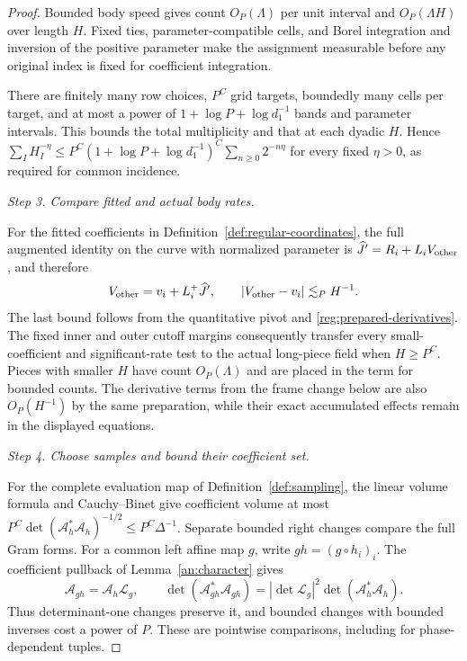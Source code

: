 \documentclass[11pt]{amsart}
\theoremstyle{definition}
\theoremstyle{remark}
\numberwithin{equation}{section}
\begin{document}
\begin{proof}
Bounded body speed gives count $O_P(\Lambda)$ per unit interval and $O_P(\Lambda H)$ over length $H$. Fixed ties, parameter-compatible cells, and Borel integration and inversion of the positive parameter make the assignment measurable before any original index is fixed for coefficient integration.

There are finitely many row choices, $P^C$ grid targets, boundedly many cells per target, and at most a power of $1+\log P+\log d_1^{-1}$ bands and parameter intervals. This bounds the total multiplicity and that at each dyadic $H$. Hence $\sum_I H_I^{-\eta}\le P^C(1+\log P+\log d_1^{-1})^C\sum_{n\ge0}2^{-n\eta}$ for every fixed $\eta>0$, as required for common incidence.

\par\medskip\noindent\textit{Step 3. Compare fitted and actual body rates.}\par\nobreak\smallskip

For the fitted coefficients in Definition~\ref{def:regular-coordinates}, the full augmented identity on the curve with normalized parameter is $\widehat J'=R_i+L_iV_{\rm other}$, and therefore
\[
V_{\rm other}=v_i+L_i^+\widehat J',\qquad |V_{\rm other}-v_i|\lesssim_PH^{-1}.
\]
The last bound follows from the quantitative pivot and \eqref{reg:prepared-derivatives}. The fixed inner and outer cutoff margins consequently transfer every small-coefficient and significant-rate test to the actual long-piece field when $H\ge P^C$. Pieces with smaller $H$ have count $O_P(\Lambda)$ and are placed in the term for bounded counts. The derivative terms from the frame change below are also $O_P(H^{-1})$ by the same preparation, while their exact accumulated effects remain in the displayed equations.

\par\medskip\noindent\textit{Step 4. Choose samples and bound their coefficient set.}\par\nobreak\smallskip

For the complete evaluation map of Definition~\ref{def:sampling}, the linear volume formula and Cauchy--Binet give coefficient volume at most $P^C\det(\mathcal A_h^*\mathcal A_h)^{-1/2}\le P^C\Delta^{-1}$. Separate bounded right changes compare the full Gram forms. For a common left affine map $g$, write $gh=(g\circ h_i)_i$. The coefficient pullback of Lemma~\ref{an:character} gives
\[
\mathcal A_{gh}=\mathcal A_h\mathcal L_g,\qquad \det(\mathcal A_{gh}^*\mathcal A_{gh})=|\det\mathcal L_g|^2\det(\mathcal A_h^*\mathcal A_h).
\]
Thus determinant-one changes preserve it, and bounded changes with bounded inverses cost a power of $P$. These are pointwise comparisons, including for phase-dependent tuples.


\end{proof}
\end{document}
